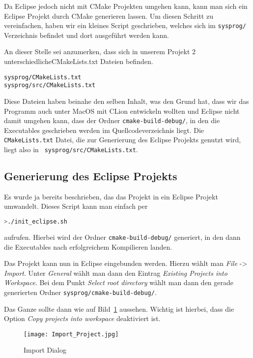 Da Eclipse jedoch nicht mit CMake Projekten umgehen kann, kann man sich ein Eclipse Projekt durch CMake generieren lassen. Um diesen Schritt zu vereinfachen, haben wir ein kleines Script geschrieben, welches sich im \texttt{sysprog/} Verzeichnis befindet und dort ausgeführt werden kann.



An dieser Stelle sei anzumerken, dass sich in unserem Projekt 2 unterschiedlicheCMakeLists.txt Dateien befinden.
\begin{verbatim}
sysprog/CMakeLists.txt
sysprog/src/CMakeLists.txt
\end{verbatim}

Diese Dateien haben beinahe den selben Inhalt, was den Grund hat, dass wir das Programm auch unter MacOS mit CLion entwickeln wollten und Eclipse nicht damit umgehen kann, dass der Ordner \texttt{cmake-build-debug/}, in den die Executables geschrieben werden im Quellcodeverzeichnis liegt. Die \texttt{CMakeLists.txt} Datei, die zur Generierung des Eclipse Projekts genutzt wird, liegt also in \texttt{
sysprog/src/CMakeLists.txt}.

\subsection{Generierung des Eclipse Projekts}
Es wurde ja bereits beschrieben, das das Projekt in ein Eclipse Projekt umwandelt. Dieses Script kann man einfach per

\begin{lstlisting}[language=bash,numbers=none]
>./init_eclipse.sh
\end{lstlisting}

aufrufen. Hierbei wird der Ordner \texttt{cmake-build-debug/} generiert, in den dann die Executables nach erfolgreichem Kompilieren landen.

Das Projekt kann nun in Eclipse eingebunden werden. Hierzu wählt man \textit{File} -> \textit{Import}. Unter \textit{General} wählt man dann den Eintrag \textit{Existing Projects into Workspace}.
Bei dem Punkt \textit{Select root directory} wählt man dann den gerade generierten Ordner \texttt{sysprog/cmake-build-debug/}.

Das Ganze sollte dann wie auf Bild~\ref{fig:import_project} aussehen. Wichtig ist hierbei, dass die Option \textit{Copy projects into workspace} deaktiviert ist.

\begin{figure}[!htb]
    \centering
      \texttt{[image: Import\_Project.jpg]}
    \caption{Import Dialog}\label{fig:import_project}
\end{figure}

